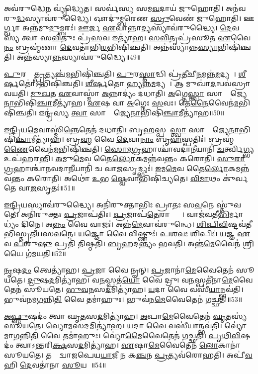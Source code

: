 𑌅𑌵॑𑌰𑍁𑌦𑍍𑌧𑍇\ul{𑌨} 𑌵𑍍𑌯𑍃॑𑌦𑍍𑌧𑍍𑌯𑍇𑌤।
𑌸𑌰𑍍𑌵॑𑌸𑍍𑌯 𑌸𑌮\ul{𑌵}𑌦𑌾𑌯॑ 𑌜𑍁𑌹𑍋𑌤𑌿।
𑌅𑌨॑𑌵𑌰𑍁\ul{𑌦𑍍𑌧}𑌸𑍍𑌯𑌾𑌵॑𑌰𑍁𑌦𑍍𑌧𑍍𑌯𑍈।
𑌔𑌦𑍁॑𑌮𑍍𑌬𑌰𑍇𑌣 \ul{𑌸𑍍𑌰𑍁}𑌵𑍇𑌣॑ 𑌜𑍁𑌹𑍋𑌤𑌿।
𑌊𑌰𑍍𑌗𑍍𑌵𑌾 𑌅𑌨𑍍𑌨॑𑌮𑍁\ul{𑌦𑍁}𑌮𑍍𑌬𑌰𑌃॑।
\ul{𑌊}𑌰𑍍𑌜 \ul{𑌏}𑌵𑌾𑌨𑍍𑌨𑌾\ul{𑌦𑍍𑌯}𑌸𑍍𑌯𑌾𑌵॑𑌰𑍁𑌦𑍍𑌧𑍍𑌯𑍈।
\ul{𑌦𑍇}𑌵𑌸𑍍𑌯॑ 𑌤𑍍𑌵𑌾 𑌸\ul{𑌵𑌿}𑌤𑍁𑌃 𑌪𑍍𑌰॑\ul{𑌸}𑌵 𑌇𑌤𑍍𑌯𑌾॑𑌹।
\ul{𑌸}\ul{𑌵𑌿}𑌤𑍃𑌪𑍍𑌰॑𑌸𑍂𑌤 \ul{𑌏}𑌵𑍈\ul{𑌨𑌂} 𑌬𑍍𑌰𑌹𑍍𑌮॑𑌣𑌾 \ul{𑌦𑍇}𑌵𑌤𑌾॑𑌭𑌿\ul{𑌰}𑌭𑌿𑌷𑌿॑𑌞𑍍𑌚𑌤𑌿।
𑌅𑌨𑍍𑌨॑𑌸𑍍𑌯𑌾𑌨𑍍𑌨\ul{𑌸𑍍𑌯𑌾}𑌭𑌿𑌷𑌿॑𑌞𑍍𑌚𑌤𑌿।
𑌅𑌨𑍍𑌨॑𑌸𑍍𑌯𑌾\ul{𑌨𑍍𑌨}𑌸𑍍𑌯𑌾𑌵॑𑌰𑍁𑌦𑍍𑌧𑍍𑌯𑍈॥49॥

\ul{𑌪𑍁}𑌰𑌸𑍍𑌤𑌾᳚\ul{𑌤𑍍𑌪𑍍𑌰}𑌤𑍍𑌯𑌞𑍍𑌚॑\ul{𑌮}𑌭𑌿𑌷𑌿॑𑌞𑍍𑌚𑌤𑌿।
\ul{𑌪𑍁}𑌰\ul{𑌸𑍍𑌤𑌾}𑌦𑍍𑌧𑌿 𑌪𑍍𑌰॑\ul{𑌤𑍀}𑌚𑍀\ul{𑌨}𑌮𑌨𑍍𑌨॑\ul{𑌮}𑌦𑍍𑌯𑌤𑍇᳚।
\ul{𑌶𑍀}\ul{𑌰𑍍}\ul{𑌷}𑌤𑍋॑\-𑌽𑌭𑌿𑌷𑌿॑𑌞𑍍𑌚𑌤𑌿।
\ul{𑌶𑍀}\ul{𑌰𑍍}\ul{𑌷}𑌤𑍋 𑌹𑍍𑌯𑌨𑍍𑌨॑\ul{𑌮}𑌦𑍍𑌯𑌤𑍇᳚।
𑌆 𑌮𑍁𑌖𑌾॑\ul{𑌦}𑌨𑍍𑌵𑌵॑\-𑌸𑍍𑌰𑌾𑌵𑌯𑌤𑌿।
\ul{𑌮𑍁}\ul{𑌖}𑌤 \ul{𑌏}𑌵𑌾𑌸𑍍𑌮𑌾॑ \ul{𑌅}𑌨𑍍𑌨𑌾𑌦𑍍𑌯𑌂॑ 𑌦𑌧𑌾𑌤𑌿।
\ul{𑌅}𑌗𑍍𑌨𑍇\ul{𑌸𑍍𑌤𑍍𑌵𑌾} 𑌸𑌾𑌮𑍍𑌰𑌾᳚𑌜𑍍𑌯𑍇\ul{𑌨𑌾}\-𑌭𑌿𑌷𑌿॑\ul{𑌞𑍍𑌚𑌾}𑌮𑍀\-𑌤𑍍𑌯𑌾॑𑌹।
\ul{𑌏}𑌷 𑌵𑌾 \ul{𑌅}𑌗𑍍𑌨𑍇𑌃 \ul{𑌸}𑌵𑌃।
𑌤𑍇\ul{𑌨𑍈}𑌵𑍈𑌨॑\ul{𑌮}𑌭𑌿\-𑌷𑌿॑𑌞𑍍𑌚𑌤𑌿।
𑌇𑌨𑍍𑌦𑍍𑌰॑𑌸𑍍𑌯 \ul{𑌤𑍍𑌵𑌾} 𑌸𑌾𑌮𑍍𑌰𑌾᳚𑌜𑍍𑌯𑍇\ul{𑌨𑌾}\-𑌭𑌿𑌷𑌿॑\ul{𑌞𑍍𑌚𑌾}𑌮𑍀\-𑌤𑍍𑌯𑌾॑𑌹॥50॥

\ul{𑌇}\ul{𑌨𑍍𑌦𑍍𑌰𑌿}𑌯\ul{𑌮𑍇}𑌵𑌾𑌸𑍍𑌮𑌿॑\ul{𑌨𑍍𑌨𑍇}𑌤𑍇𑌨॑ 𑌦𑌧𑌾𑌤𑌿।
𑌬𑍃\ul{𑌹}𑌸𑍍𑌪𑌤𑍇᳚\ul{𑌸𑍍𑌤𑍍𑌵𑌾} 𑌸𑌾𑌮𑍍𑌰𑌾᳚𑌜𑍍𑌯𑍇\ul{𑌨𑌾}𑌭𑌿\-𑌷𑌿॑\ul{𑌞𑍍𑌚𑌾}𑌮𑍀𑌤𑍍𑌯𑌾॑𑌹।
𑌬𑍍𑌰\ul{𑌹𑍍𑌮} 𑌵𑍈 \ul{𑌦𑍇}𑌵𑌾\ul{𑌨𑌾𑌂} 𑌬𑍃\ul{𑌹}𑌸𑍍𑌪𑌤𑌿𑌃॑।
𑌬𑍍𑌰𑌹𑍍𑌮॑\ul{𑌣𑍈}𑌵𑍈𑌨॑\ul{𑌮}𑌭𑌿\-𑌷𑌿॑𑌞𑍍𑌚𑌤𑌿।
\ul{𑌸𑍋}\ul{𑌮}\ul{𑌗𑍍𑌰}𑌹𑌾𑌶𑍍𑌚𑌾॑𑌵𑌦𑌾\ul{𑌨𑍀}𑌯𑌾𑌨𑌿॑ \ul{𑌚}𑌰𑍍𑌤𑍍𑌵𑌿\ul{𑌗𑍍𑌭𑍍𑌯} 𑌉𑌪॑𑌹𑌰𑌨𑍍𑌤𑌿।
\ul{𑌅}𑌮𑍁\ul{𑌮𑍇}𑌵 𑌤𑍈\ul{𑌰𑍍𑌲𑍋}𑌕𑌮𑌨𑍍𑌨॑𑌵𑌨𑍍𑌤𑌂 𑌕𑌰𑍋𑌤𑌿।
\ul{𑌸𑍁}\ul{𑌰𑌾}\ul{𑌗𑍍𑌰}𑌹𑌾𑌶𑍍𑌚𑌾॑𑌨𑌵𑌦𑌾\ul{𑌨𑍀}\-𑌯𑌾𑌨𑌿॑ 𑌚 𑌵𑌾\ul{𑌜}𑌸𑍃𑌦𑍍𑌭𑍍𑌯𑌃॑।
\ul{𑌇}𑌮\ul{𑌮𑍇}𑌵 𑌤𑍈\ul{𑌰𑍍𑌲𑍋}𑌕𑌮𑌨𑍍𑌨॑𑌵𑌨𑍍𑌤𑌂 𑌕𑌰𑍋𑌤𑌿।
𑌅𑌥𑍋॑ \ul{𑌉}𑌭𑌯𑍀᳚\ul{𑌷𑍍𑌵𑍇}𑌵𑌾𑌭𑌿𑌷𑌿॑𑌚𑍍𑌯𑌤𑍇।
\ul{𑌵𑌿}\ul{𑌮𑌾}𑌥𑌂 𑌕𑍁॑𑌰𑍍𑌵𑌤𑍇 𑌵𑌾\ul{𑌜}𑌸𑍃𑌤𑌃॑॥51॥

\ul{𑌇}\ul{𑌨𑍍𑌦𑍍𑌰𑌿}𑌯𑌸𑍍𑌯𑌾𑌵॑𑌰𑍁𑌦𑍍𑌧𑍍𑌯𑍈।
𑌅𑌨𑌿॑𑌰𑍁𑌕𑍍𑌤𑌾𑌭𑌿𑌃 𑌪𑍍𑌰𑌾𑌤𑌃 𑌸\ul{𑌵}𑌨𑍇 𑌸𑍍𑌤𑍁॑𑌵𑌤𑍇।
𑌅𑌨𑌿॑𑌰𑍁𑌕𑍍𑌤𑌃 \ul{𑌪𑍍𑌰}𑌜𑌾𑌪॑𑌤𑌿𑌃।
\ul{𑌪𑍍𑌰}𑌜𑌾𑌪॑\ul{𑌤𑍇}𑌰𑌾𑌪𑍍𑌤𑍍𑌯𑍈᳚।
𑌵𑌾𑌜॑𑌵𑌤𑍀\ul{𑌭𑌿}𑌰𑍍𑌮𑌾𑌧𑍍𑌯𑌂॑ 𑌦𑌿𑌨𑍇।
𑌅\ul{𑌨𑍍𑌨𑌂} 𑌵𑍈 𑌵𑌾𑌜𑌃॑।
𑌅𑌨𑍍𑌨॑\ul{𑌮𑍇}𑌵𑌾𑌵॑𑌰𑍁𑌨𑍍𑌧𑍇।
\ul{𑌶𑌿}\ul{𑌪𑌿}\ul{𑌵𑌿}𑌷𑍍𑌟\-𑌵॑𑌤𑍀𑌭𑌿𑌸𑍍𑌤𑍃𑌤𑍀𑌯𑌸\ul{𑌵}𑌨𑍇।
\ul{𑌯}𑌜𑍍𑌞𑍋 𑌵𑍈 𑌵𑌿𑌷𑍍𑌣𑍁𑌃॑।
\ul{𑌪}𑌶\ul{𑌵𑌃} 𑌶𑌿𑌪𑌿𑌃॑।
\ul{𑌯}𑌜𑍍𑌞 \ul{𑌏}𑌵 \ul{𑌪}𑌶𑍁\ul{𑌷𑍁} 𑌪𑍍𑌰𑌤𑌿॑ 𑌤𑌿𑌷𑍍𑌠𑌤𑌿।
\ul{𑌬𑍃}𑌹𑌦𑌨𑍍𑌤𑍍𑌯𑌂॑ 𑌭𑌵𑌤𑌿।
𑌅𑌨𑍍𑌤॑\ul{𑌮𑍇}𑌵𑍈𑌨॑ \ul{𑌶𑍍𑌰𑌿}𑌯𑍈 𑌗॑𑌮𑌯𑌤𑌿॥52॥\anuvakamend[\ul{𑌅}\ul{𑌶𑍍𑌞𑍀}𑌯𑌾𑌦𑌨𑍍𑌨॑𑌸𑍍𑌯𑌾\ul{𑌨𑍍𑌨}𑌸𑍍𑌯𑌾𑌵॑𑌰𑍁\ul{𑌦𑍍𑌧𑍍𑌯𑌾} 𑌇𑌨𑍍𑌦𑍍𑌰॑𑌸𑍍𑌯 \ul{𑌤𑍍𑌵𑌾} 𑌸𑌾𑌮𑍍𑌰𑌾᳚𑌜𑍍𑌯𑍇\ul{𑌨𑌾}𑌭𑌿𑌷𑌿॑\ul{𑌞𑍍𑌚𑌾}𑌮𑍀𑌤𑍍𑌯𑌾॑𑌹 𑌵𑌾\ul{𑌜}𑌸𑍃\ul{𑌤𑌃} 𑌶𑌿\ul{𑌪𑌿}𑌸𑍍𑌤𑍍𑌰𑍀𑌣𑌿॑ 𑌚]

\ul{𑌨𑍃}𑌷\ul{𑌦𑌂} 𑌤𑍍𑌵𑍇𑌤𑍍𑌯𑌾॑𑌹।
\ul{𑌪𑍍𑌰}𑌜𑌾 𑌵𑍈 𑌨𑍄𑌨𑍍।
\ul{𑌪𑍍𑌰}𑌜𑌾𑌨𑌾॑\ul{𑌮𑍇}𑌵𑍈𑌤𑍇𑌨॑ 𑌸𑍂𑌯𑌤𑍇।
\ul{𑌦𑍍𑌰𑍁}𑌷\ul{𑌦}𑌮𑌿𑌤𑍍𑌯𑌾॑𑌹।
𑌵\ul{𑌨}𑌸𑍍𑌪𑌤॑\ul{𑌯𑍋} 𑌵𑍈 𑌦𑍍𑌰𑍁।
𑌵\ul{𑌨}𑌸𑍍𑌪𑌤𑍀॑𑌨𑌾\ul{𑌮𑍇}𑌵𑍈𑌤𑍇𑌨॑ 𑌸𑍂𑌯𑌤𑍇।
\ul{𑌭𑍁}\ul{𑌵}\ul{𑌨}𑌸\ul{𑌦}𑌮𑌿𑌤𑍍𑌯𑌾॑𑌹।
\ul{𑌯}𑌦𑌾 𑌵𑍈 𑌵𑌸𑍀॑\ul{𑌯𑌾}𑌨𑍍𑌭𑌵॑𑌤𑌿।
𑌭𑍁𑌵॑𑌨𑌮\ul{𑌗}𑌨𑍍𑌨𑌿\ul{𑌤𑌿} 𑌵𑍈 𑌤𑌮𑌾॑𑌹𑍁𑌃।
𑌭𑍁𑌵॑𑌨\ul{𑌮𑍇}𑌵𑍈𑌤𑍇𑌨॑ 𑌗𑌚𑍍𑌛𑌤𑌿॥53॥

\ul{𑌅}\ul{𑌫𑍍𑌸𑍁}𑌷𑌦𑌂॑ 𑌤𑍍𑌵𑌾 𑌘𑍃\ul{𑌤}𑌸\ul{𑌦}𑌮𑌿𑌤𑍍𑌯𑌾॑𑌹।
\ul{𑌅}𑌪𑌾\ul{𑌮𑍇}𑌵𑍈𑌤𑍇𑌨॑ \ul{𑌘𑍃}𑌤𑌸𑍍𑌯॑ 𑌸𑍂𑌯𑌤𑍇।
\ul{𑌵𑍍𑌯𑍋}\ul{𑌮}𑌸\ul{𑌦}𑌮𑌿𑌤𑍍𑌯𑌾॑𑌹।
\ul{𑌯}𑌦𑌾 𑌵𑍈 𑌵𑌸𑍀॑\ul{𑌯𑌾}𑌨𑍍𑌭𑌵॑𑌤𑌿।
𑌵𑍍𑌯𑍋॑𑌮𑌾\ul{𑌗}𑌨𑍍𑌨𑌿\ul{𑌤𑌿} 𑌵𑍈 𑌤𑌮𑌾॑𑌹𑍁𑌃।
𑌵𑍍𑌯𑍋॑\ul{𑌮𑍈}𑌵𑍈𑌤𑍇𑌨॑ 𑌗𑌚𑍍𑌛𑌤𑌿।
\ul{𑌪𑍃}\ul{𑌥𑌿}\ul{𑌵𑌿}𑌷𑌦𑌂॑ 𑌤𑍍𑌵𑌾\-𑌽𑌨𑍍𑌤𑌰𑌿\ul{𑌕𑍍𑌷}𑌸\ul{𑌦}𑌮𑌿𑌤𑍍𑌯𑌾॑𑌹।
\ul{𑌏}𑌷𑌾\ul{𑌮𑍇}𑌵𑍈𑌤𑍇𑌨॑ \ul{𑌲𑍋}𑌕𑌾𑌨𑌾॑ 𑌸𑍂𑌯𑌤𑍇।
𑌤𑌸𑍍𑌮𑌾᳚𑌦𑍍𑌵𑌾𑌜𑌪𑍇𑌯\ul{𑌯𑌾}𑌜𑍀 𑌨 𑌕\ul{𑌞𑍍𑌚}𑌨 \ul{𑌪𑍍𑌰}𑌤𑍍𑌯𑌵॑𑌰𑍋𑌹𑌤𑌿।
𑌅𑌪𑍀॑\ul{𑌵} 𑌹𑌿 \ul{𑌦𑍇}𑌵𑌤𑌾॑𑌨𑌾 \ul{𑌸𑍂}𑌯𑌤𑍇᳚॥54॥

